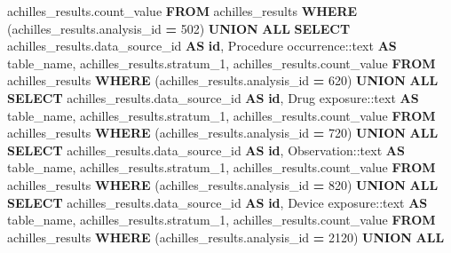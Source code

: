 \documentclass[
]{book}
\newenvironment{Shaded}{\begin{snugshade}}{\end{snugshade}}
\newcommand{\CharTok}[1]{\textcolor[rgb]{0.31,0.60,0.02}{#1}}
\newcommand{\DecValTok}[1]{\textcolor[rgb]{0.00,0.00,0.81}{#1}}
\newcommand{\KeywordTok}[1]{\textcolor[rgb]{0.13,0.29,0.53}{\textbf{#1}}}
\newcommand{\NormalTok}[1]{#1}
\newcommand{\OperatorTok}[1]{\textcolor[rgb]{0.81,0.36,0.00}{\textbf{#1}}}
\newcommand{\StringTok}[1]{\textcolor[rgb]{0.31,0.60,0.02}{#1}}
\begin{document}
\begin{Shaded}
\begin{Highlighting}[]
\NormalTok{           achilles\_results.count\_value}
          \KeywordTok{FROM}\NormalTok{ achilles\_results}
         \KeywordTok{WHERE}\NormalTok{ (achilles\_results.analysis\_id }\OperatorTok{=} \DecValTok{502}\NormalTok{)}
       \KeywordTok{UNION} \KeywordTok{ALL}
        \KeywordTok{SELECT}\NormalTok{ achilles\_results.data\_source\_id }\KeywordTok{AS} \KeywordTok{id}\NormalTok{,}
           \StringTok{\textquotesingle{}Procedure occurrence\textquotesingle{}}\NormalTok{:}\CharTok{:text} \KeywordTok{AS}\NormalTok{ table\_name,}
\NormalTok{           achilles\_results.stratum\_1,}
\NormalTok{           achilles\_results.count\_value}
          \KeywordTok{FROM}\NormalTok{ achilles\_results}
         \KeywordTok{WHERE}\NormalTok{ (achilles\_results.analysis\_id }\OperatorTok{=} \DecValTok{620}\NormalTok{)}
       \KeywordTok{UNION} \KeywordTok{ALL}
        \KeywordTok{SELECT}\NormalTok{ achilles\_results.data\_source\_id }\KeywordTok{AS} \KeywordTok{id}\NormalTok{,}
           \StringTok{\textquotesingle{}Drug exposure\textquotesingle{}}\NormalTok{:}\CharTok{:text} \KeywordTok{AS}\NormalTok{ table\_name,}
\NormalTok{           achilles\_results.stratum\_1,}
\NormalTok{           achilles\_results.count\_value}
          \KeywordTok{FROM}\NormalTok{ achilles\_results}
         \KeywordTok{WHERE}\NormalTok{ (achilles\_results.analysis\_id }\OperatorTok{=} \DecValTok{720}\NormalTok{)}
       \KeywordTok{UNION} \KeywordTok{ALL}
        \KeywordTok{SELECT}\NormalTok{ achilles\_results.data\_source\_id }\KeywordTok{AS} \KeywordTok{id}\NormalTok{,}
           \StringTok{\textquotesingle{}Observation\textquotesingle{}}\NormalTok{:}\CharTok{:text} \KeywordTok{AS}\NormalTok{ table\_name,}
\NormalTok{           achilles\_results.stratum\_1,}
\NormalTok{           achilles\_results.count\_value}
          \KeywordTok{FROM}\NormalTok{ achilles\_results}
         \KeywordTok{WHERE}\NormalTok{ (achilles\_results.analysis\_id }\OperatorTok{=} \DecValTok{820}\NormalTok{)}
       \KeywordTok{UNION} \KeywordTok{ALL}
        \KeywordTok{SELECT}\NormalTok{ achilles\_results.data\_source\_id }\KeywordTok{AS} \KeywordTok{id}\NormalTok{,}
           \StringTok{\textquotesingle{}Device exposure\textquotesingle{}}\NormalTok{:}\CharTok{:text} \KeywordTok{AS}\NormalTok{ table\_name,}
\NormalTok{           achilles\_results.stratum\_1,}
\NormalTok{           achilles\_results.count\_value}
          \KeywordTok{FROM}\NormalTok{ achilles\_results}
         \KeywordTok{WHERE}\NormalTok{ (achilles\_results.analysis\_id }\OperatorTok{=} \DecValTok{2120}\NormalTok{)}
       \KeywordTok{UNION} \KeywordTok{ALL}

\end{Highlighting}
\end{Shaded}
\end{document}
